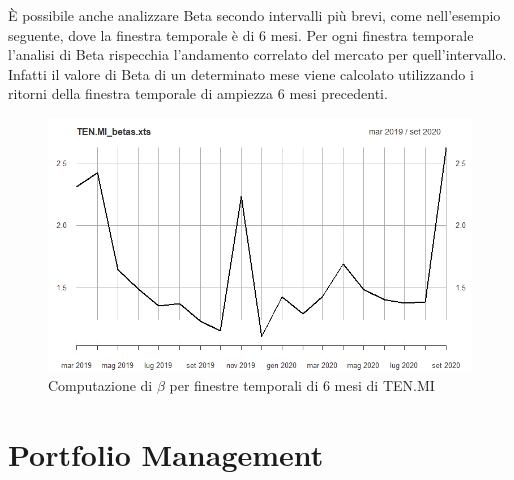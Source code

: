 \documentclass[12pt]{article}
\begin{document}
È possibile anche analizzare Beta secondo intervalli più brevi, come nell'esempio seguente, dove la finestra temporale è di 6 mesi. Per ogni finestra temporale l'analisi di Beta rispecchia l'andamento correlato del mercato per quell'intervallo. Infatti il valore di Beta di un determinato mese viene calcolato utilizzando i ritorni della finestra temporale di ampiezza 6 mesi precedenti.
\begin{figure}[!htb]
    \centering
    \includegraphics[width=1\textwidth]{immagini/betaTenMIfinestratotale.png}
    \caption{Computazione di $\beta$ per finestre temporali di 6 mesi di TEN.MI}
\end{figure}
\FloatBarrier


\newpage
\section{Portfolio Management}
\end{document}
